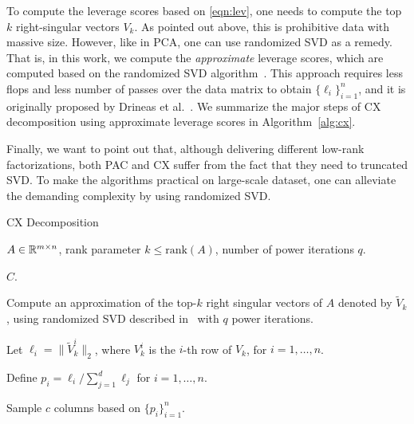 To compute the leverage scores based on \eqref{eqn:lev}, one needs to compute the top $k$ right-singular vectors $V_k$. As pointed out above, this is prohibitive data with massive size.
However, like in PCA, one can use randomized SVD as a remedy.
That is, in this work, we compute the {\it approximate} leverage scores, which are computed based on the randomized SVD algorithm~\cite{HMT11}.
This approach requires less flops and less number of passes over the data matrix to obtain $\{\ell_i\}_{i=1}^n$, and it is originally proposed by Drineas et al.~\cite{DMMW12_JMLR}.
We summarize the major steps of CX decomposition using approximate leverage scores in Algorithm~\ref{alg:cx}.

Finally, we want to point out that,
although delivering different low-rank factorizations, both PAC and CX suffer from the fact that they need to truncated SVD.
To make the algorithms practical on large-scale dataset, one can alleviate the demanding complexity by using randomized SVD. 


 \begin{algorithm}[tb]
 \caption{CX Decomposition}
  \label{alg:cx}
  \begin{algorithmic}[1]
    \Require $A \in \mathbb{R}^{m\times n}$, rank parameter $k \leq \textrm{rank}(A)$, number of power iterations $q$.

    \Ensure $C$.
    

    \State Compute an approximation of the top-$k$ right singular vectors of $A$ denoted by $\tilde V_k$, using randomized SVD described in~\cite{HMT11} with $q$ power iterations.
    
    \State Let $\ell_i = \| \tilde V_k^i\|_2$, where $V_k^i$ is the $i$-th row of $V_k$, for $i = 1, \ldots, n$. 
    
    \State Define $p_i = \ell_i / \sum_{j=1}^d \ell_j$ for $i=1,\ldots,n$.
    
    \State Sample $c$ columns based on $\{p_i\}_{i=1}^n$.

    

    \end{algorithmic}
\end{algorithm}



